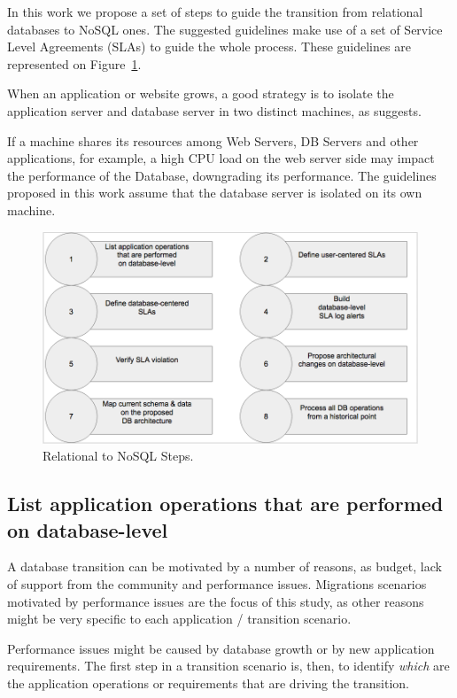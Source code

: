 In this work we propose a set of steps to guide the transition from relational databases to NoSQL ones. The suggested guidelines make use of a set of Service Level Agreements (SLAs) to guide the whole process. These guidelines are represented on Figure~\ref{fig:guidelinesNoSQL}.

When an application or website grows, a good strategy is to isolate the application server and database server in two distinct machines, as \cite{dorm} suggests.

If a machine shares its resources among Web Servers, DB Servers and other applications, for example, a high CPU load on the web server side may impact the performance of the Database, downgrading its performance. The guidelines proposed in this work assume that the database server is isolated on its own machine.

\begin{figure}[ht!]
\centering
\includegraphics[width=150mm]{Imagens/guidelines.png}
\caption{Relational to NoSQL Steps.\label{fig:guidelinesNoSQL}}
\end{figure}

\subsection{List application operations that are performed on database-level}

A database transition can be motivated by a number of reasons, as budget, lack of support from the community and performance issues. Migrations scenarios motivated by performance issues are the focus of this study, as other reasons might be very specific to each application / transition scenario. 

Performance issues might be caused by database growth or by new application requirements. The first step in a transition scenario is, then, to identify \textit{which} are the application operations or requirements that are driving the transition. 

